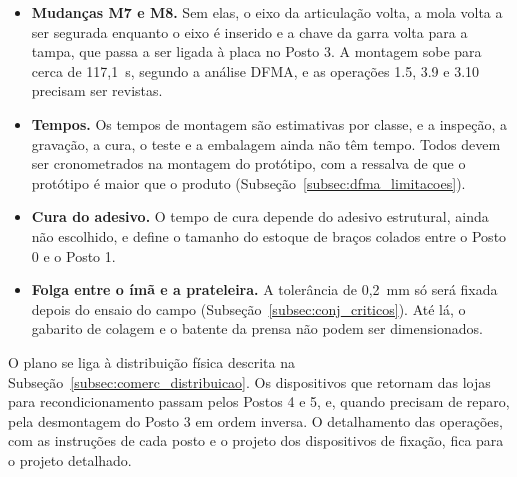 \begin{itemize}
  \item \textbf{Mudanças M7 e M8.} Sem elas, o eixo da articulação volta, a mola volta a ser segurada enquanto o eixo é inserido e a chave da garra volta para a tampa, que passa a ser ligada à placa no Posto 3. A montagem sobe para cerca de 117,1~s, segundo a análise DFMA, e as operações 1.5, 3.9 e 3.10 precisam ser revistas.
  \item \textbf{Tempos.} Os tempos de montagem são estimativas por classe, e a inspeção, a gravação, a cura, o teste e a embalagem ainda não têm tempo. Todos devem ser cronometrados na montagem do protótipo, com a ressalva de que o protótipo é maior que o produto (Subseção~\ref{subsec:dfma_limitacoes}).
  \item \textbf{Cura do adesivo.} O tempo de cura depende do adesivo estrutural, ainda não escolhido, e define o tamanho do estoque de braços colados entre o Posto 0 e o Posto 1.
  \item \textbf{Folga entre o ímã e a prateleira.} A tolerância de 0,2~mm só será fixada depois do ensaio do campo (Subseção~\ref{subsec:conj_criticos}). Até lá, o gabarito de colagem e o batente da prensa não podem ser dimensionados.
\end{itemize}

O plano se liga à distribuição física descrita na Subseção~\ref{subsec:comerc_distribuicao}. Os dispositivos que retornam das lojas para recondicionamento passam pelos Postos 4 e 5, e, quando precisam de reparo, pela desmontagem do Posto 3 em ordem inversa. O detalhamento das operações, com as instruções de cada posto e o projeto dos dispositivos de fixação, fica para o projeto detalhado.